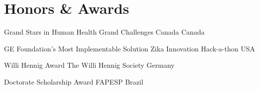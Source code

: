 
\section{Honors \& Awards}

    \vspace{-0.2em}
    
    	{Grand Stars in Human Health}
    	{Grand Challenges Canada}
    	{Canada}
    	{}{}
    
    	{GE Foundation's Most Implementable Solution}
    	{Zika Innovation Hack-a-thon}
    	{USA}
    	{}{}
    
    	{Willi Hennig Award}
    	{The Willi Hennig Society}
    	{Germany}
    	{}{}
    
    	{Doctorate Scholarship Award}
    	{FAPESP}
    	{Brazil}
    	{}{}
    
    \vspace{-0.8em}